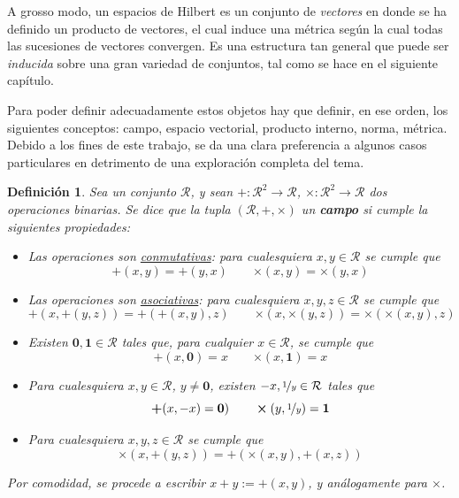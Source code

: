 \documentclass[12pt,letterpaper]{book}
\newtheorem{definicion}{Definición}[chapter]
\begin{document}
A grosso modo, un espacios de Hilbert es un conjunto de \textit{vectores} en donde se ha definido un producto de vectores, el cual induce una métrica según la cual todas las sucesiones de vectores convergen.
%
Es una estructura tan general que puede ser \textit{inducida} sobre una gran variedad de conjuntos, tal como se hace en el siguiente capítulo.

Para poder definir adecuadamente estos objetos hay que definir, en ese orden, los siguientes conceptos: campo, espacio vectorial, producto interno, norma, métrica.
%
Debido a los fines de este trabajo, se da una clara preferencia a algunos casos particulares en detrimento de una exploración completa del tema.

\begin{definicion}
Sea un conjunto $\mathcal{R}$, y sean $\boldsymbol{+} : \mathcal{R}^{2} \rightarrow \mathcal{R}$, $\boldsymbol{\times} : \mathcal{R}^{2} \rightarrow \mathcal{R}$ dos operaciones binarias. 
%
Se dice que la tupla $(\mathcal{R},\boldsymbol{+},\boldsymbol{\times})$ un \textbf{campo} si cumple la siguientes propiedades:
\begin{itemize}
\item Las operaciones son \ul{conmutativas}: para cualesquiera $x, y \in \mathcal{R}$ se cumple que 
\begin{equation*}
\boldsymbol{+}(x,y) = \boldsymbol{+}(y,x) \qquad \boldsymbol{\times}(x,y) = \boldsymbol{\times}(y,x)
\end{equation*}
\item Las operaciones son \ul{asociativas}: para cualesquiera $x, y, z \in \mathcal{R}$ se cumple que 
\begin{equation*}
\boldsymbol{+}(x,\boldsymbol{+}(y,z)) = \boldsymbol{+}(\boldsymbol{+}(x,y),z) \qquad \boldsymbol{\times}(x,\boldsymbol{\times}(y,z)) = \boldsymbol{\times}(\boldsymbol{\times}(x,y),z)
\end{equation*}
\item Existen $\boldsymbol{0}, \boldsymbol{1} \in \mathcal{R}$ tales que, para cualquier $x \in \mathcal{R}$, se cumple que
\begin{equation*}
\boldsymbol{+}(x,\boldsymbol{0}) = x \qquad \boldsymbol{\times}(x,\boldsymbol{1}) = x
\end{equation*}
\item Para cualesquiera $x, y \in \mathcal{R}$, $y \neq \boldsymbol{0}$, existen $-x, \nicefrac{1}{y} \in \mathcal{R}$ tales que
\begin{equation*}
\boldsymbol{+}(x,-x)=\boldsymbol{0}) \qquad \boldsymbol{\times}(y,\nicefrac{1}{y}) = \boldsymbol{1}
\end{equation*}
\item Para cualesquiera $x, y, z \in \mathcal{R}$ se cumple que 
\begin{equation*}
\boldsymbol{\times}(x, \boldsymbol{+}(y,z)) = \boldsymbol{+}( \boldsymbol{\times}(x,y), \boldsymbol{+}(x,z) )
\end{equation*}
\end{itemize}
Por comodidad, se procede a escribir $x+y := \boldsymbol{+}(x,y)$, y análogamente para $\boldsymbol{\times}$.
\end{definicion}
\end{document}
